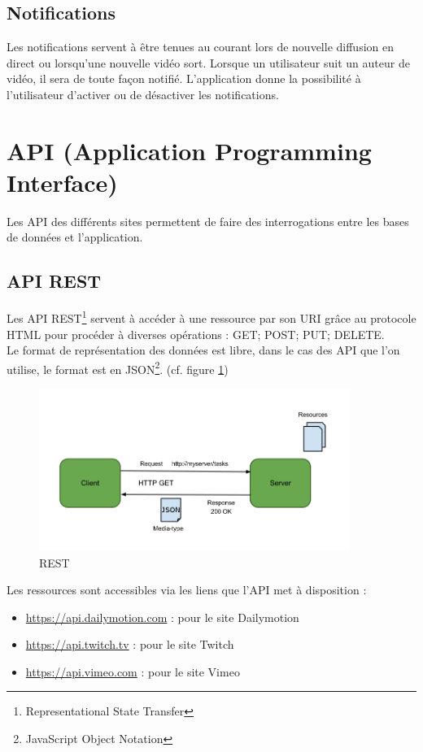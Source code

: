 \documentclass[11pt]{report} %
\begin{document}
		\subsection{Notifications}
		Les notifications servent à être tenues au courant lors de nouvelle diffusion en direct ou lorsqu'une nouvelle vidéo sort.
		Lorsque un utilisateur suit un auteur de vidéo, il sera de toute façon notifié.
		L'application donne la possibilité à l'utilisateur d'activer ou de désactiver les notifications.
		
		
	\newpage
	\section{API (Application Programming Interface)}
	\label{api}
	Les API des différents sites permettent de faire des interrogations entre les bases de données et l'application.
		\subsection{API REST}
		Les API REST\footnote{Representational State Transfer} servent à accéder à une ressource par son URI grâce au protocole HTML pour procéder à diverses opérations : GET; POST; PUT; DELETE. \\		
		Le format de représentation des données est libre, dans le cas des API que l'on utilise, le format est en JSON\footnote{JavaScript Object Notation}. (cf. figure \ref{rest})
		
		\begin{figure}[h]
			\center
			\includegraphics[width=0.9\textwidth]{../img/rest.png}
			\caption{REST}
			\label{rest}
		\end{figure}
		
		\noindent
		Les ressources sont accessibles via les liens que l'API met à disposition :

		\begin{itemize}
		\item \url{https://api.dailymotion.com} : pour le site Dailymotion
		\item \url{https://api.twitch.tv} : pour le site Twitch
		\item \url{https://api.vimeo.com} : pour le site Vimeo
		\end{itemize}
		
\end{document}
